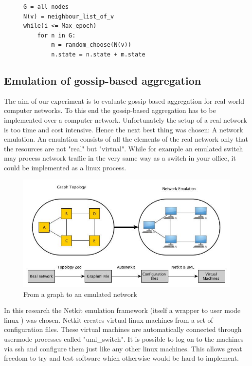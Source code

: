 \begin{figure}[!h]
\begin{lstlisting}[caption={Pseudo Code for gossip-based aggregation simulation}, label=code:simulation, mathescape=true, captionpos=b]
G = all_nodes
N(v) = neighbour_list_of_v
while(i <= Max_epoch)
	for n in G:
		m = random_choose(N(v))
		n.state = n.state + m.state
\end{lstlisting}
\end{figure}

\subsection{Emulation of gossip-based aggregation}
The aim of our experiment is to evaluate gossip based aggregation for real world computer networks. To this end the gossip-based aggregation has to be implemented over a computer network. Unfortunately the setup of a real network is too time and cost intensive. Hence the next best thing was chosen: A network emulation. 
An emulation consists of all the elements of the real network only that the resources are not "real" but "virtual". While for example an emulated switch may process network traffic in the very same way as a switch in your office, it could be implemented as a linux process.

\begin{figure}[h!]
    \begin{center}
        \includegraphics[scale=0.6]{graph_to_emulation}
    \end{center}
    \caption{From a graph to an emulated network}
    \label{fig:graph_to_emulation}
\end{figure}

In this research the Netkit emulation framework (itself a wrapper to user mode linux \cite{uml}) was chosen. Netkit \cite{netkit} creates virtual linux machines from a set of configuration files. These virtual machines are automatically connected through usermode processes called "uml\_switch". It is possible to log on to the machines via ssh and configure them just like any other linux machines. This allows great freedom to try and test software which otherwise would be hard to implement.

